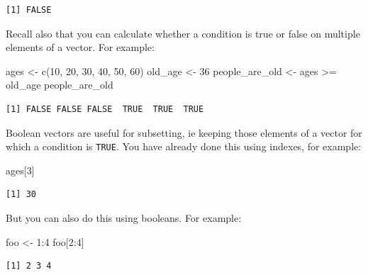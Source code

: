 \documentclass[
]{book}
\newenvironment{Shaded}{\begin{snugshade}}{\end{snugshade}}
\newcommand{\DecValTok}[1]{\textcolor[rgb]{0.00,0.00,0.81}{#1}}
\newcommand{\FunctionTok}[1]{\textcolor[rgb]{0.00,0.00,0.00}{#1}}
\newcommand{\NormalTok}[1]{#1}
\newcommand{\OtherTok}[1]{\textcolor[rgb]{0.56,0.35,0.01}{#1}}
\newcommand{\SpecialCharTok}[1]{\textcolor[rgb]{0.00,0.00,0.00}{#1}}
\begin{document}
\begin{verbatim}
[1] FALSE
\end{verbatim}

Recall also that you can calculate whether a condition is true or false on multiple elements of a vector. For example:

\begin{Shaded}
\begin{Highlighting}[]
\NormalTok{ages }\OtherTok{\textless{}{-}} \FunctionTok{c}\NormalTok{(}\DecValTok{10}\NormalTok{, }\DecValTok{20}\NormalTok{, }\DecValTok{30}\NormalTok{, }\DecValTok{40}\NormalTok{, }\DecValTok{50}\NormalTok{, }\DecValTok{60}\NormalTok{)}
\NormalTok{old\_age }\OtherTok{\textless{}{-}} \DecValTok{36}
\NormalTok{people\_are\_old }\OtherTok{\textless{}{-}}\NormalTok{ ages }\SpecialCharTok{\textgreater{}=}\NormalTok{ old\_age}
\NormalTok{people\_are\_old}
\end{Highlighting}
\end{Shaded}

\begin{verbatim}
[1] FALSE FALSE FALSE  TRUE  TRUE  TRUE
\end{verbatim}

Boolean vectors are useful for subsetting, ie keeping those elements of a vector for which a condition is \texttt{TRUE}. You have already done this using indexes, for example:

\begin{Shaded}
\begin{Highlighting}[]
\NormalTok{ages[}\DecValTok{3}\NormalTok{]}
\end{Highlighting}
\end{Shaded}

\begin{verbatim}
[1] 30
\end{verbatim}

But you can also do this using booleans. For example:

\begin{Shaded}
\begin{Highlighting}[]
\NormalTok{foo }\OtherTok{\textless{}{-}} \DecValTok{1}\SpecialCharTok{:}\DecValTok{4}
\NormalTok{foo[}\DecValTok{2}\SpecialCharTok{:}\DecValTok{4}\NormalTok{]}
\end{Highlighting}
\end{Shaded}

\begin{verbatim}
[1] 2 3 4
\end{verbatim}
\end{document}
